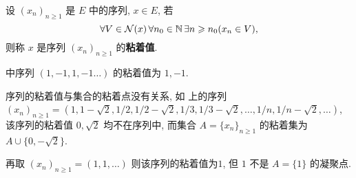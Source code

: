 \begin{Def}[序列的粘着值]\label{def:序列的粘着值}
      设 $ (x_{n})_{n\geqslant1} $ 是 $ E $ 中的序列,  $ x\in E $, 若
      \[
           \forall V\in\mathcal{N}(x)\,\forall n_{0}\in\mathbb{N}\,\exists n\geqslant n_{0}(x_{n}\in V),
      \]
      则称 $ x $ 是序列 $ (x_{n})_{n\geqslant1} $ 的\textbf{粘着值}.  
\end{Def}
\begin{Ex}
     \R 中序列 $ (1, -1, 1, -1\ldots) $ 的粘着值为 $ 1, -1 $.  
\end{Ex}
\begin{Rmk}
     序列的粘着值与集合的粘着点没有关系, 如 \R 上的序列 $ (x_{n})_{n\geqslant1}=(1, 1-\sqrt{2}, {1}/{2}, {1}/{2}-\sqrt{2}, {1}/{3}, {1}/{3}-\sqrt{2}, \ldots, {1}/{n}, {1}/{n}-\sqrt{2}, \ldots) $, 该序列的粘着值 $ 0, \sqrt{2} $ 均不在序列中, 而集合 $ A=\{ x_{n} \}_{n\geqslant1} $ 的粘着集为 $ A\cup\{ 0,-\sqrt{2} \} $. 

     再取 $ (x_{n})_{n\geqslant1}=(1, 1, \ldots) $ 则该序列的粘着值为$1$,  但 $ 1 $ 不是 $ A=\{ 1 \} $ 的凝聚点.  
\end{Rmk}
